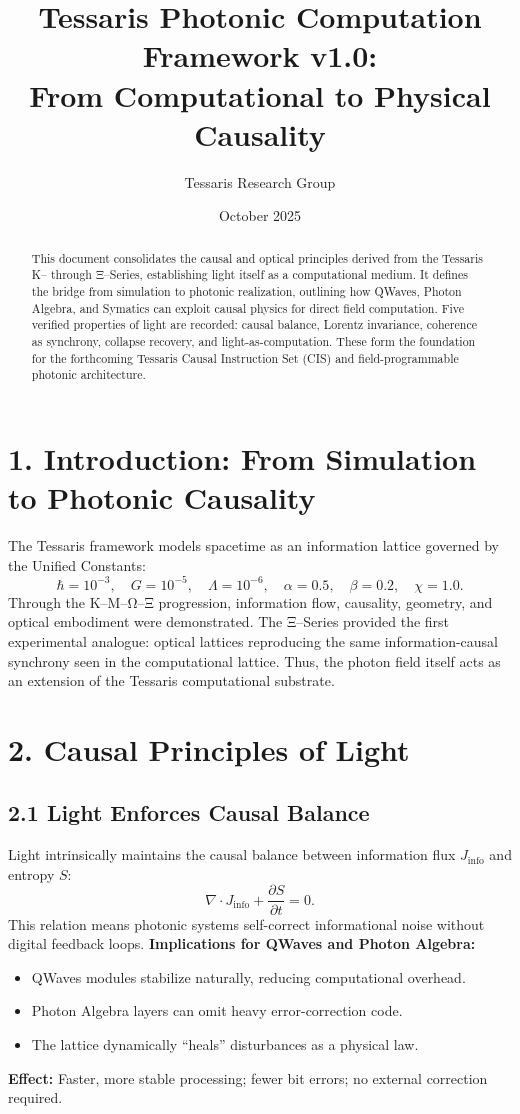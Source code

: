 \documentclass[11pt,a4paper]{article}
\title{\textbf{Tessaris Photonic Computation Framework v1.0:\\From Computational to Physical Causality}}
\author{Tessaris Research Group}
\date{October 2025}
\begin{document}
\maketitle

\begin{abstract}
This document consolidates the causal and optical principles derived from the Tessaris K-- through Ξ--Series, establishing light itself as a computational medium.  
It defines the bridge from simulation to photonic realization, outlining how QWaves, Photon Algebra, and Symatics can exploit causal physics for direct field computation.  
Five verified properties of light are recorded: causal balance, Lorentz invariance, coherence as synchrony, collapse recovery, and light-as-computation.  
These form the foundation for the forthcoming Tessaris Causal Instruction Set (CIS) and field-programmable photonic architecture.
\end{abstract}

\section{1. Introduction: From Simulation to Photonic Causality}
The Tessaris framework models spacetime as an information lattice governed by the Unified Constants:
\[
\hbar = 10^{-3},\quad G = 10^{-5},\quad \Lambda = 10^{-6},\quad \alpha = 0.5,\quad \beta = 0.2,\quad \chi = 1.0.
\]
Through the K--M--Ω--Ξ progression, information flow, causality, geometry, and optical embodiment were demonstrated.  
The Ξ--Series provided the first experimental analogue: optical lattices reproducing the same information-causal synchrony seen in the computational lattice.  
Thus, the photon field itself acts as an extension of the Tessaris computational substrate.

\section{2. Causal Principles of Light}

\subsection*{2.1 Light Enforces Causal Balance}
Light intrinsically maintains the causal balance between information flux \(J_{\mathrm{info}}\) and entropy \(S\):
\[
\nabla \cdot J_{\mathrm{info}} + \frac{\partial S}{\partial t} = 0.
\]
This relation means photonic systems self-correct informational noise without digital feedback loops.  
\textbf{Implications for QWaves and Photon Algebra:}
\begin{itemize}
  \item QWaves modules stabilize naturally, reducing computational overhead.
  \item Photon Algebra layers can omit heavy error-correction code.
  \item The lattice dynamically “heals” disturbances as a physical law.
\end{itemize}
\textbf{Effect:} Faster, more stable processing; fewer bit errors; no external correction required.
\end{document}
